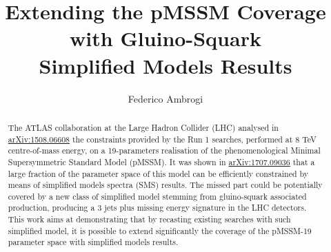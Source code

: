 \documentclass[preprint,number,sort&compress,twocolumn,3p]{elsstyarticle}
\begin{document}
\title{{\boldmath Extending the pMSSM Coverage with Gluino-Squark \\ Simplified Models Results}}

\date{}
\author[a]{Federico Ambrogi}
\address[a]{University of Vienna, Faculty of Physics, Bolzmanngasse 5, A-1090 Wien, Austria}



\begin{abstract}
The ATLAS collaboration at the Large Hadron Collider (LHC) analysed in \href{https://arxiv.org/abs/1508.06608}{arXiv:1508.06608} the constraints provided by the Run 1 searches, performed at 8 TeV centre-of-mass energy, on a 19-parameters realisation of the phenomenological Minimal Supersymmetric Standard Model (pMSSM). It was shown in \href{https://arxiv.org/abs/1707.09036}{arXiv:1707.09036} that a large fraction of the parameter space of this model can be efficiently constrained by means of simplified models spectra (SMS) results. The missed part could be potentially covered by a new class of simplified model stemming from gluino-squark associated production, producing a 3 jets plus missing energy signature in the LHC detectors. This work aims at demonstrating that by recasting existing searches with such simplified model, it is possible to extend significantly the coverage of the pMSSM-19 parameter space with simplified models results.
\end{abstract}


\maketitle
\setcounter{tocdepth}{1}
\tableofcontents
\end{document}
